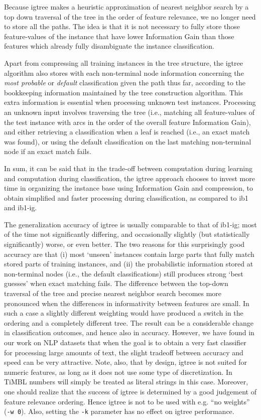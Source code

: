 \documentclass{report}
\begin{document}
Because {\sc igtree} makes a heuristic approximation of nearest
neighbor search by a top down traversal of the tree in the order of
feature relevance, we no longer need to store all the paths. The idea
is that it is not necessary to fully store those feature-values of the
instance that have lower Information Gain than those features which
already fully disambiguate the instance classification.

Apart from compressing all training instances in the tree structure,
the {\sc igtree} algorithm also stores with each non-terminal node
information concerning the {\em most probable} or {\em default}
classification given the path thus far, according to the bookkeeping
information maintained by the tree construction algorithm. This extra
information is essential when processing unknown test instances.
Processing an unknown input involves traversing the tree (i.e.,
matching all feature-values of the test instance with arcs in the
order of the overall feature Information Gain), and either retrieving
a classification when a leaf is reached (i.e., an exact match was
found), or using the default classification on the last matching
non-terminal node if an exact match fails.

In sum, it can be said that in the trade-off between computation
during learning and computation during classification, the {\sc
igtree} approach chooses to invest more time in organizing the
instance base using Information Gain and compression, to obtain
simplified and faster processing during classification,
as compared to {\sc ib1} and {\sc ib1-ig}.
 
The generalization accuracy of {\sc igtree} is usually comparable to
that of {\sc ib1-ig}; most of the time not significantly differing,
and occasionally slightly (but statistically significantly) worse, or
even better.  The two reasons for this surprisingly good accuracy are
that (i) most `unseen' instances contain large parts that
fully match stored parts of training instances, and (ii) the
probabilistic information stored at non-terminal nodes (i.e., the
default classifications) still produces strong `best guesses' when
exact matching fails. The difference between the top-down traversal of
the tree and precise nearest neighbor search becomes more pronounced
when the differences in informativity between features are small. In
such a case a slightly different weighting would have produced a
switch in the ordering and a completely different tree. The result can
be a considerable change in classification outcomes, and hence also in
accuracy. However, we have found in our work on NLP datasets that when
the goal is to obtain a very fast classifier for processing large
amounts of text, the slight tradeoff between accuracy and speed can be
very attractive. Note, also, that by design, {\sc igtree} is not
suited for numeric features, as long as it does not use some type of
discretization. In TiMBL numbers will simply be treated as literal
strings in this case. Moreover, one should realize that the success of
{\sc igtree} is determined by a good judgement of feature relevance
ordering. Hence {\sc igtree} is not to be used with e.g. ``no
weights'' ({\tt -w 0}). Also, setting the {\tt -k} parameter has no
effect on {\sc igtree} performance.
\end{document}
